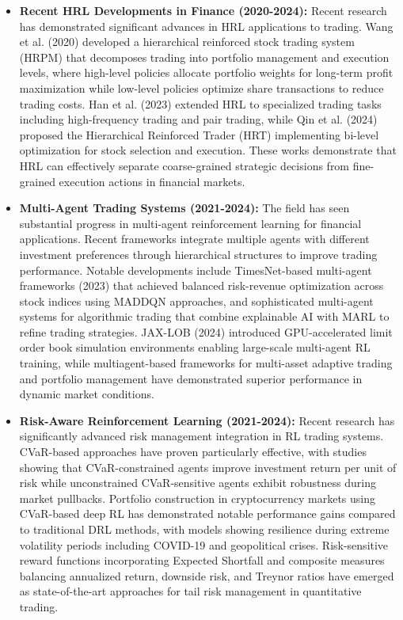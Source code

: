 \documentclass[11pt]{article}
\begin{document}
\begin{itemize}
\item   \textbf{Recent HRL Developments in Finance (2020-2024):} Recent research has demonstrated significant advances in HRL applications to trading. Wang et al. (2020) developed a hierarchical reinforced stock trading system (HRPM) that decomposes trading into portfolio management and execution levels, where high-level policies allocate portfolio weights for long-term profit maximization while low-level policies optimize share transactions to reduce trading costs. Han et al. (2023) extended HRL to specialized trading tasks including high-frequency trading and pair trading, while Qin et al. (2024) proposed the Hierarchical Reinforced Trader (HRT) implementing bi-level optimization for stock selection and execution. These works demonstrate that HRL can effectively separate coarse-grained strategic decisions from fine-grained execution actions in financial markets.

\item   \textbf{Multi-Agent Trading Systems (2021-2024):} The field has seen substantial progress in multi-agent reinforcement learning for financial applications. Recent frameworks integrate multiple agents with different investment preferences through hierarchical structures to improve trading performance. Notable developments include TimesNet-based multi-agent frameworks (2023) that achieved balanced risk-revenue optimization across stock indices using MADDQN approaches, and sophisticated multi-agent systems for algorithmic trading that combine explainable AI with MARL to refine trading strategies. JAX-LOB (2024) introduced GPU-accelerated limit order book simulation environments enabling large-scale multi-agent RL training, while multiagent-based frameworks for multi-asset adaptive trading and portfolio management have demonstrated superior performance in dynamic market conditions.

\item   \textbf{Risk-Aware Reinforcement Learning (2021-2024):} Recent research has significantly advanced risk management integration in RL trading systems. CVaR-based approaches have proven particularly effective, with studies showing that CVaR-constrained agents improve investment return per unit of risk while unconstrained CVaR-sensitive agents exhibit robustness during market pullbacks. Portfolio construction in cryptocurrency markets using CVaR-based deep RL has demonstrated notable performance gains compared to traditional DRL methods, with models showing resilience during extreme volatility periods including COVID-19 and geopolitical crises. Risk-sensitive reward functions incorporating Expected Shortfall and composite measures balancing annualized return, downside risk, and Treynor ratios have emerged as state-of-the-art approaches for tail risk management in quantitative trading.


\end{itemize}
\end{document}
